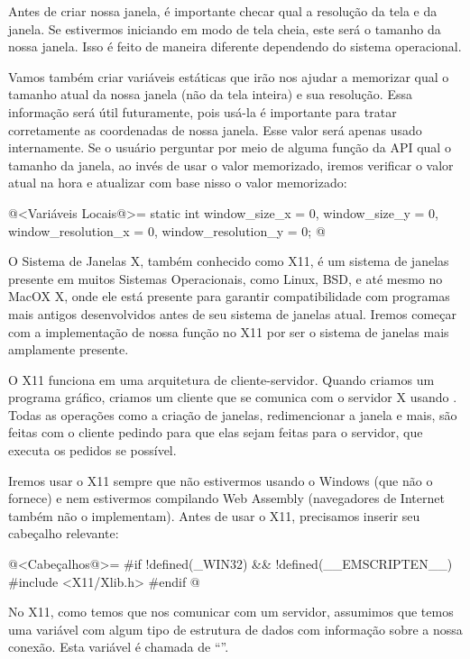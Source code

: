 Antes de criar nossa janela, é importante checar qual a resolução da
tela e da janela. Se estivermos iniciando em modo de tela cheia, este
será o tamanho da nossa janela. Isso é feito de maneira diferente
dependendo do sistema operacional.

Vamos também criar variáveis estáticas que irão nos ajudar a memorizar
qual o tamanho atual da nossa janela (não da tela inteira) e sua
resolução. Essa informação será útil futuramente, pois usá-la é
importante para tratar corretamente as coordenadas de nossa
janela. Esse valor será apenas usado internamente. Se o usuário
perguntar por meio de alguma função da API qual o tamanho da janela,
ao invés de usar o valor memorizado, iremos verificar o valor atual na
hora e atualizar com base nisso o valor memorizado:

\iniciocodigo
@<Variáveis Locais@>=
static int window_size_x = 0, window_size_y = 0, window_resolution_x = 0,
           window_resolution_y = 0;
@
\fimcodigo


O Sistema de Janelas X, também conhecido como X11, é um sistema de
janelas presente em muitos Sistemas Operacionais, como Linux, BSD, e
até mesmo no MacOX X, onde ele está presente para garantir
compatibilidade com programas mais antigos desenvolvidos antes de seu
sistema de janelas atual. Iremos começar com a implementação de nossa
função no X11 por ser o sistema de janelas mais amplamente presente.

O X11 funciona em uma arquitetura de cliente-servidor. Quando criamos
um programa gráfico, criamos um cliente que se comunica com o servidor
X usando . Todas as operações como a criação de
janelas, redimencionar a janela e mais, são feitas com o cliente
pedindo para que elas sejam feitas para o servidor, que executa os
pedidos se possível.

Iremos usar o X11 sempre que não estivermos usando o Windows (que não
o fornece) e nem estivermos compilando Web Assembly (navegadores de
Internet também não o implementam). Antes de usar o X11, precisamos
inserir seu cabeçalho relevante:

\iniciocodigo
@<Cabeçalhos@>=
#if !defined(_WIN32) && !defined(__EMSCRIPTEN__)
#include <X11/Xlib.h>
#endif
@
\fimcodigo

No X11, como temos que nos comunicar com um servidor, assumimos que
temos uma variável com algum tipo de estrutura de dados com informação
sobre a nossa conexão. Esta variável é chamada de
``''.

